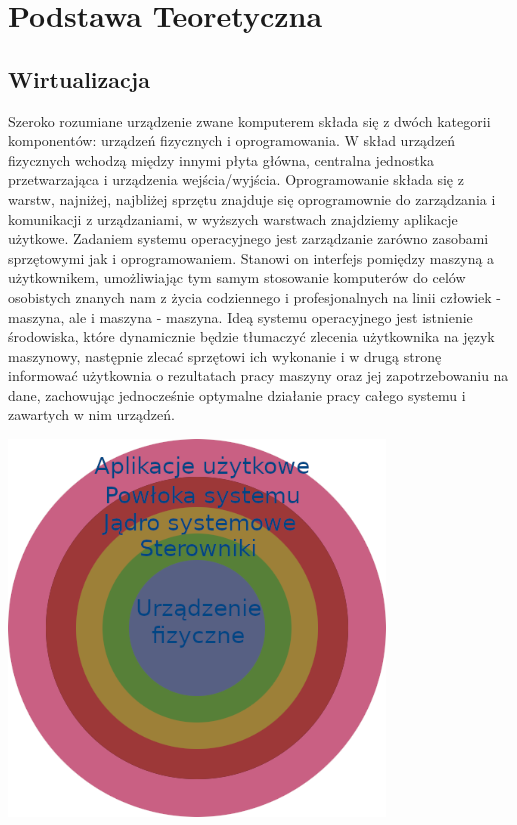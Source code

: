\documentclass[polish, a4paper, 12pt, oneside]{book}
\begin{document}
\chapter{Podstawa Teoretyczna}
\section{Wirtualizacja}
Szeroko rozumiane urządzenie zwane komputerem składa się z dwóch kategorii komponentów: urządzeń fizycznych i oprogramowania. W skład urządzeń fizycznych wchodzą między innymi płyta główna, centralna jednostka przetwarzająca i urządzenia wejścia/wyjścia. Oprogramowanie składa się z warstw, najniżej, najbliżej sprzętu znajduje się oprogramownie do zarządzania i komunikacji z urządzaniami, w wyższych warstwach znajdziemy aplikacje użytkowe. Zadaniem systemu operacyjnego jest zarządzanie zarówno zasobami sprzętowymi jak i oprogramowaniem. Stanowi on interfejs pomiędzy maszyną a użytkownikem, umożliwiając tym samym stosowanie komputerów do celów osobistych znanych nam z życia codziennego i profesjonalnych na linii człowiek - maszyna, ale i maszyna - maszyna. Ideą systemu operacyjnego jest istnienie środowiska, które dynamicznie będzie tłumaczyć zlecenia użytkownika na język maszynowy, następnie zlecać sprzętowi ich wykonanie i w drugą stronę informować użytkownia o rezultatach pracy maszyny oraz jej zapotrzebowaniu na dane, zachowując jednocześnie optymalne działanie pracy całego systemu i zawartych w nim urządzeń.
   
\begin{center}
\includegraphics[height=100mm]{schemat_os.png}
\end{center}
\end{document}
